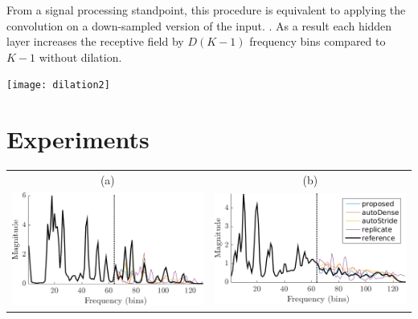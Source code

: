 \documentclass[a0,portrait,20pt]{a0poster}
\begin{document}
\begin{multicols}{2}
\begin{minipage}[c]{.4\linewidth}
From a signal processing standpoint, this procedure is equivalent to applying the convolution on a down-sampled version of the input. . As a result each hidden layer increases the receptive field by $D(K-1)$ frequency bins compared to $K-1$ without dilation.
\end{minipage}
\begin{minipage}[c]{.55\linewidth}
\begin{center}\vspace{1cm}
\texttt{[image: dilation2]}
\end{center}\vspace{1cm}
\end{minipage}

\section*{Experiments}

\begin{center}\vspace{1cm}
\begin{tabular}{cc}
  (a) & (b) \\
  \includegraphics[width = .45\columnwidth]{solos_1141.png}
&
  \includegraphics[width = .45\columnwidth]{gtzan_1120.png}
\end{tabular}
\end{center}\vspace{1cm}


\end{multicols}
\end{document}
